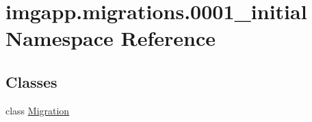 \hypertarget{namespaceimgapp_1_1migrations_1_10001__initial}{}\section{imgapp.\+migrations.0001\+\_\+initial Namespace Reference}
\label{namespaceimgapp_1_1migrations_1_10001__initial}
\subsection*{Classes}
\begin{DoxyCompactItemize}
\item 
class \hyperlink{classimgapp_1_1migrations_1_10001__initial_1_1Migration}{Migration}
\end{DoxyCompactItemize}

